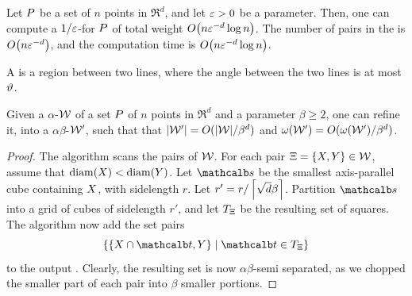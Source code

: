 \documentclass[12pt]{article}%
\begin{document}
\begin{theorem}
    Let $P$ be a set of $n$ points in $\Re^d$, and let $\varepsilon > 0$ be
    a parameter. Then, one can compute a $1/\varepsilon$-\SSPD for $P$ of
    total weight $O\pth{n \eps^{-d} \log n}$. The number of pairs in
    the \SSPD is $O\pth{n \eps^{-d}}$, and the computation time is
    $O\pth{ n \eps^{-d} \log n }$.
\end{theorem}

A  is a region between two lines, where
the angle between the two lines is at most $\vartheta$.


\begin{lemma}
    Given a $\alpha$-\SSPD $\mathcal{W}$ of a set $P$ of $n$ points in
    $\Re^d$ and a parameter $\beta \geq 2$, one can refine it, into a
    $\alpha\beta$-\SSPD $\mathcal{W}'$, such that that
    $|\mathcal{W}'| = O(|\mathcal{W}|/\beta^d)$ and
    $\WeightX{\WS'} = O(\WeightX{\WS'}/\beta^d)$.
\end{lemma}
\begin{proof}
    The algorithm scans the pairs of $\mathcal{W}$. For each pair
    $\Xi = \{ X, Y \} \in \mathcal{W}$, assume that
    $\diameterX{\PSX} < \diameterX{\PSY}$. Let $\sqr$ be the smallest
    axis-parallel cube containing $X$, with sidelength $r$.  Let
    $r' = r / \left\lceil {\sqrt{d} \beta } \right\rceil$.  Partition $\sqr$ into a grid
    of cubes of sidelength $r'$, and let $T_\Xi$ be the resulting
    set of squares. The algorithm now add the set pairs
    \begin{equation*}
        \Set{ \{ \PSX \cap \sqrA, \PSY \} }{ \sqrA \in T_\Pair }
    \end{equation*}
    to the output \SSPD. Clearly, the resulting set is now
    $\alpha\beta$-semi separated, as we chopped the smaller part of
    each pair into $\beta$ smaller portions.
\end{proof}
\end{document}

